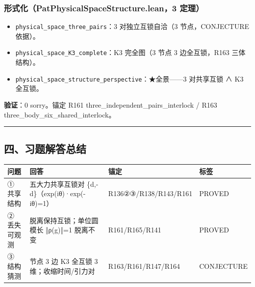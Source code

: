 \documentclass[
]{article}
\newcounter{none} %
\providecommand{\tightlist}{%
  \setlength{\itemsep}{0pt}\setlength{\parskip}{0pt}}
\begin{document}
\subsubsection{形式化（PatPhysicalSpaceStructure.lean，3
定理）}\label{ux5f62ux5f0fux5316patphysicalspacestructure.lean3-ux5b9aux7406}

\begin{itemize}
\tightlist
\item
  \texttt{physical\_space\_three\_pairs}：3 对独立互锁自洽（3
  节点，CONJECTURE 依据）。
\item
  \texttt{physical\_space\_K3\_complete}：K3 完全图（3 节点 3
  边全互锁，R163 三体结构）。
\item
  \texttt{physical\_space\_structure\_perspective}：★全景------3
  对共享互锁 ∧ K3 全互锁。
\end{itemize}

\textbf{验证}：0 sorry。锚定 R161 three\_independent\_pairs\_interlock /
R163 three\_body\_six\_shared\_interlock。

\begin{center}\rule{0.5\linewidth}{0.5pt}\end{center}

\subsection{四、习题解答总结}\label{ux56dbux4e60ux9898ux89e3ux7b54ux603bux7ed3}

{\def\LTcaptype{none} %
\begin{longtable}[]{@{}
  >{\raggedright\arraybackslash}p{}
  >{\raggedright\arraybackslash}p{}
  >{\raggedright\arraybackslash}p{}
  >{\raggedright\arraybackslash}p{}@{}}
\toprule\noalign{}
\begin{minipage}[b]{\linewidth}\raggedright
问题
\end{minipage} & \begin{minipage}[b]{\linewidth}\raggedright
回答
\end{minipage} & \begin{minipage}[b]{\linewidth}\raggedright
锚定
\end{minipage} & \begin{minipage}[b]{\linewidth}\raggedright
标签
\end{minipage} \\
\midrule\noalign{}
\endhead
\bottomrule\noalign{}
\endlastfoot
① 共享结构 & 五大力共享互锁对 \{d,-d\}（exp(iθ)·exp(-iθ)=1） &
R136②③/R138/R143/R161 & PROVED \\
② 丢失可观测 & 脱离保持互锁；单位圆模长 ‖ρ(g)‖=1 脱离不变 &
R161/R165/R141 & PROVED \\
③ 结构猜测 & 3 节点 3 边 K3 全互锁 3 维；收缩时间/引力对 &
R163/R161/R147/R164 & CONJECTURE \\
\end{longtable}
}
\end{document}
